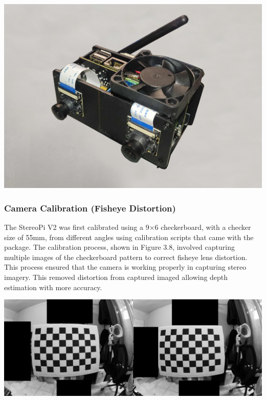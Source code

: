 \begin{center}
	\includegraphics[scale=0.12]{prototype.png}
\end{center}


\subsubsection{Camera Calibration (Fisheye Distortion)}
The StereoPi V2 was first calibrated using a 9×6 checkerboard, with a checker size of 55mm, from different angles using calibration scripts that came with the package. The calibration process, shown in Figure 3.8, involved capturing multiple images of the checkerboard pattern to correct fisheye lens distortion. This process ensured that the camera is working properly in capturing stereo imagery. This removed distortion from captured imaged allowing depth estimation with more accuracy.

\begin{center}
	\includegraphics[scale=0.25]{calibration.png}
\end{center}

